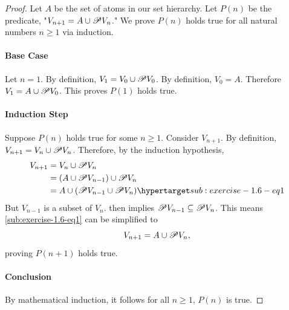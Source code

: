 \documentclass{report}
\begin{document}
  \begin{proof}

    Let $A$ be the set of atoms in our set hierarchy.
    Let $P(n)$ be the predicate, "$V_{n + 1} = A \cup \mathscr{P}V_n$."
    We prove $P(n)$ holds true for all natural numbers $n \geq 1$ via induction.

    \paragraph{Base Case}%

      Let $n = 1$.
      By definition, $V_1 = V_0 \cup \mathscr{P}V_0$.
      By definition, $V_0 = A$.
      Therefore $V_1 = A \cup \mathscr{P}V_0$.
      This proves $P(1)$ holds true.

    \paragraph{Induction Step}%

      Suppose $P(n)$ holds true for some $n \geq 1$.
      Consider $V_{n+1}$.
      By definition, $V_{n+1} = V_n \cup \mathscr{P}V_n$.
      Therefore, by the induction hypothesis,
        \begin{align}
          V_{n+1}
            & = V_n \cup \powerset{V_n}
              \nonumber \\
            & = (A \cup \powerset{V_{n-1}}) \cup \powerset{V_n}
              \nonumber \\
            & = A \cup (\powerset{V_{n-1}} \cup \powerset{V_n})
              \hyperlabel{sub:exercise-1.6-eq1}
        \end{align}
      But $V_{n-1}$ is a subset of $V_n$.
       then implies
        $\mathscr{P}V_{n-1} \subseteq \mathscr{P}V_n$.
      This means \eqref{sub:exercise-1.6-eq1} can be simplified to
        $$V_{n+1} = A \cup \mathscr{P}V_n,$$
      proving $P(n+1)$ holds true.

    \paragraph{Conclusion}%

      By mathematical induction, it follows for all $n \geq 1$, $P(n)$ is true.

  \end{proof}

\subsection{}%
\end{document}
